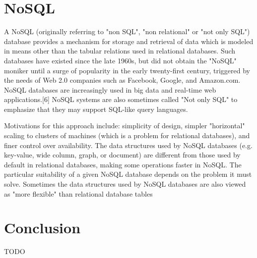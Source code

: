 \section{NoSQL}
A NoSQL (originally referring to "non SQL", "non relational" or "not only
SQL") database provides a mechanism for storage and retrieval of data which
is modeled in means other than the tabular relations used in relational
databases. Such databases have existed since the late 1960s, but did not obtain
the "NoSQL" moniker until a surge of popularity in the early twenty-first
century, triggered by the needs of Web 2.0 companies such as Facebook,
Google, and Amazon.com. NoSQL databases are increasingly used in big
data and real-time web applications.[6] NoSQL systems are also sometimes called
"Not only SQL" to emphasize that they may support SQL-like query
languages.

Motivations for this approach include: simplicity of design, simpler
"horizontal" scaling to clusters of machines (which is a problem for relational
databases), and finer control over availability. The data structures used by
NoSQL databases (e.g. key-value, wide column, graph, or document) are different
from those used by default in relational databases, making some operations
faster in NoSQL. The particular suitability of a given NoSQL database depends on
the problem it must solve. Sometimes the data structures used by NoSQL databases
are also viewed as "more flexible" than relational database tables

\section*{Conclusion}
TODO
